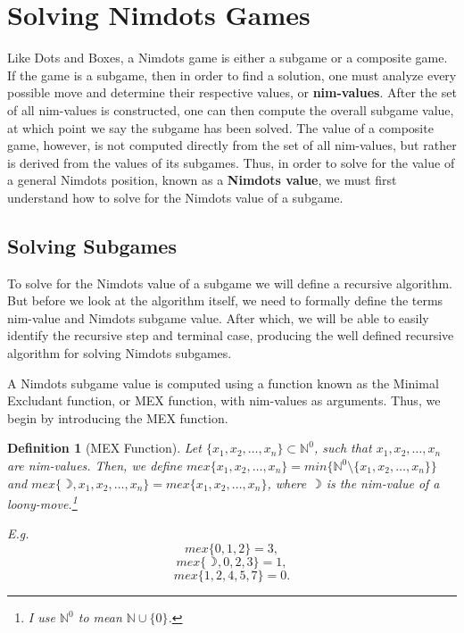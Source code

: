 \documentclass[12pt,twoside]{reedthesis}
\newtheorem{mydef}{Definition}
\begin{document}
\section{Solving Nimdots Games}
Like Dots and Boxes, a Nimdots game is either a subgame or a composite game.  If the game is a subgame, then in order to find a solution, one must analyze every possible move and determine their respective values, or \textbf{nim-values}.  After the set of all nim-values is constructed, one can then compute the overall subgame value, at which point we say the subgame has been solved.  The value of a composite game, however, is not computed directly from the set of all nim-values, but rather is derived from the values of its subgames. Thus, in order to solve for the value of a general Nimdots position, known as a \textbf{Nimdots value}, we must first understand how to solve for the Nimdots value of a subgame.

\subsection{Solving Subgames}
To solve for the Nimdots value of a subgame we will define a recursive algorithm.  But before we look at the algorithm itself, we need to formally define the terms nim-value and Nimdots subgame value.  After which, we will be able to easily identify the recursive step and terminal case, producing the well defined recursive algorithm for solving Nimdots subgames.

A Nimdots subgame value is computed using a function known as the Minimal Excludant function, or MEX function, with nim-values as arguments.  Thus, we begin by introducing the MEX function.


\begin{mydef}[MEX Function]
Let $\{ x_1,x_2,\dots,x_n \} \subset \mathbb N^0$, such that  $x_1,x_2,\dots,x_n$ are nim-values.  Then, we define $mex \{ x_1,x_2,\dots,x_n \} = min \{ \mathbb N^0 \setminus \{ x_1,x_2,\dots,x_n \} \}$ and $mex \{ \rightmoon ,  x_1,x_2,\dots,x_n \} = mex \{  x_1,x_2,\dots,x_n \}$, where $\rightmoon$ is the nim-value of a loony-move.\footnote[4]{I use $\mathbb N^0$ to mean $\mathbb N \cup \{ 0 \}$.}
\end{mydef}

\noindent
\emph{E.g.}
\begin{equation}
mex \{ 0,1,2 \} = 3,
\end{equation}
\begin{equation}
mex \{ \rightmoon ,0,2,3 \} = 1,
\end{equation}
\begin{equation}
mex \{ 1,2,4,5,7 \} = 0.
\end{equation}
\end{document}

